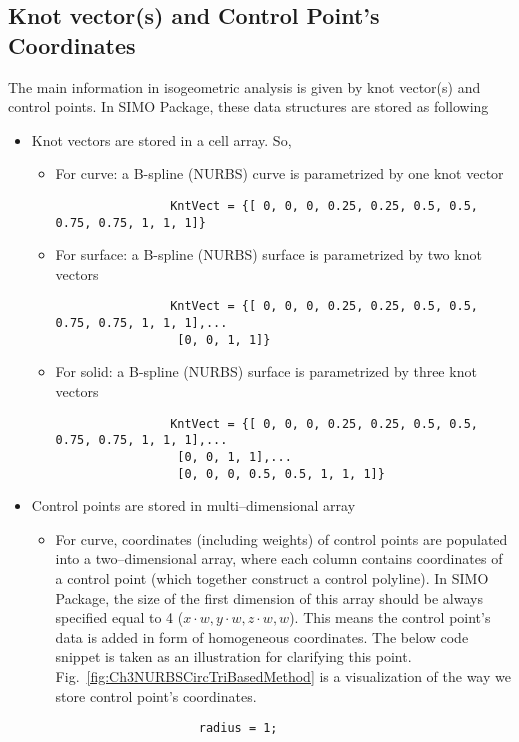 \subsection{Knot vector(s) and Control Point's Coordinates}
The main information in isogeometric analysis is given by knot vector(s) and control points. In SIMO Package, these data structures are stored as following
\begin{itemize}
    \item Knot vectors are stored in a cell array. So,
        \begin{itemize}
            \item For curve: a B-spline (NURBS) curve is parametrized by one knot vector
            \begin{lstlisting}
                KntVect = {[ 0, 0, 0, 0.25, 0.25, 0.5, 0.5, 0.75, 0.75, 1, 1, 1]}
            \end{lstlisting}
            \item For surface: a B-spline (NURBS) surface is parametrized by two knot vectors
            \begin{lstlisting}
                KntVect = {[ 0, 0, 0, 0.25, 0.25, 0.5, 0.5, 0.75, 0.75, 1, 1, 1],...
                 [0, 0, 1, 1]}
            \end{lstlisting}
            \item For solid: a B-spline (NURBS) surface is parametrized by three knot vectors
            \begin{lstlisting}
                KntVect = {[ 0, 0, 0, 0.25, 0.25, 0.5, 0.5, 0.75, 0.75, 1, 1, 1],...
                 [0, 0, 1, 1],...
                 [0, 0, 0, 0.5, 0.5, 1, 1, 1]}
            \end{lstlisting}
        \end{itemize}
    \item Control points are stored in multi--dimensional array
        \begin{itemize}
            \item For curve, coordinates (including weights) of control points are populated into a two--dimensional array, where each column contains coordinates of a control point (which together construct a control polyline). In SIMO Package, the size of the first dimension of this array should be always specified equal to 4 ($x \cdot w, y \cdot w, z \cdot w, w$). This means the control point's data is added in form of homogeneous coordinates. The below code snippet is taken as an illustration for clarifying this point. Fig.~\ref{fig:Ch3NURBSCircTriBasedMethod} is a visualization of the way we store control point's coordinates.
                \begin{lstlisting}
                    radius = 1;


\end{lstlisting}
\end{itemize}
\end{itemize}
